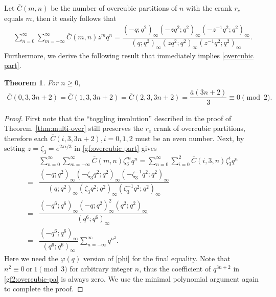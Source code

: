 \documentclass[12pt]{amsart}
\numberwithin{equation}{section}
\theoremstyle{plain}
\newtheorem{theorem}{Theorem}[section]
\theoremstyle{definition}
\begin{document}
Let $\overline{C}(m,n)$ be the number of overcubic partitions of $n$ with the crank $r_c$ equals $m$, then it easily follows that
\begin{align}
\sum_{n=0}^{\infty}\sum_{m=-\infty}^{\infty}\overline{C}(m,n)z^{m}q^{n}=\dfrac{(-q;q^{2})_{\infty}(-zq^{2};q^{2})_{\infty}(-z^{-1}q^{2};q^{2})_{\infty}}{(q;q^{2})_{\infty}
(zq^{2};q^{2})_{\infty}(z^{-1}q^{2};q^{2})_{\infty}}.\label{gf:overcubic part}
\end{align}
Furthermore, we derive the following result that immediately implies \eqref{overcubic part}.
\begin{theorem}\label{thm:overcubic}
For $n\geq0$,
\begin{align*}
\overline{C}(0,3,3n+2)=\overline{C}(1,3,3n+2)=\overline{C}(2,3,3n+2)=\dfrac{\overline{a}(3n+2)}{3}\equiv 0 \pmod 2.
\end{align*}
\end{theorem}
\begin{proof}
First note that the ``toggling involution'' described in the proof of Theorem~\ref{thm:multi-over} still preserves the $r_c$ crank of overcubic partitions, therefore each $\overline{C}(i,3,3n+2), i=0,1,2$ must be an even number. Next, by setting $z=\zeta_{3}=e^{2\pi i/3}$ in \eqref{gf:overcubic part} gives
\begin{align}\label{gf2:overcubic-pa}
 &\sum_{n=0}^{\infty}\sum_{m=-\infty}^{\infty}\overline{C}(m,n)\zeta_{3}^{m}q^{n}=\sum_{n=0}^{\infty}\sum_{i=0}^{2}\overline{C}(i,3,n)\zeta_{3}^{i}q^{n}\\
 =&\dfrac{(-q;q^{2})_{\infty}(-\zeta_{3}q^{2};q^{2})_{\infty}(-\zeta_3^{-1}q^{2};q^{2})_{\infty}}{(q;q^{2})_{\infty}(\zeta_{3}q^{2};q^{2})_{\infty}
 (\zeta_3^{-1}q^{2};q^{2})_{\infty}}\nonumber\\
 =&\dfrac{(-q^{6};q^{6})_{\infty}(-q;q^{2})_{\infty}^{2}(q^{2};q^{2})_{\infty}}{(q^{6};q^{6})_{\infty}}\nonumber\\
 =&\dfrac{(-q^{6};q^{6})_{\infty}}{(q^{6};q^{6})_{\infty}}\sum_{n=-\infty}^{\infty}q^{n^{2}}.\nonumber
\end{align}
Here we need the $\varphi(q)$ version of \eqref{phi} for the final equality. Note that $n^{2}\equiv0~\textrm{or}~1\pmod{3}$ for arbitrary integer $n$, thus the coefficient of $q^{3n+2}$ in \eqref{gf2:overcubic-pa} is always zero. We use the minimal polynomial argument again to complete the proof.
\end{proof}
\end{document}
